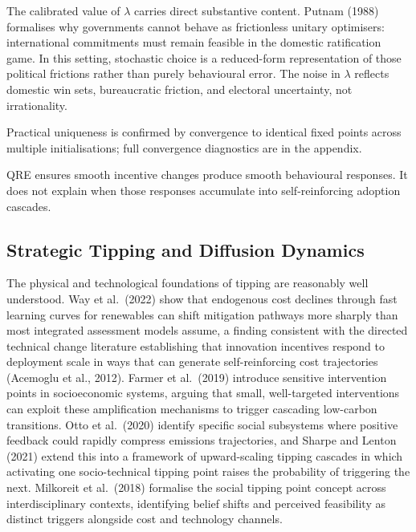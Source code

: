 \documentclass[10pt,a4paper]{article}
\begin{document}
The calibrated value of $\lambda$ carries direct substantive content. Putnam (1988) formalises why governments
cannot behave as frictionless unitary optimisers: international commitments must remain feasible in the
domestic ratification game. In this setting, stochastic choice is a reduced-form representation of those
political frictions rather than purely behavioural error. The noise in $\lambda$ reflects domestic win sets,
bureaucratic friction, and electoral uncertainty, not irrationality.

Practical uniqueness is confirmed by convergence to identical fixed points across multiple initialisations; full convergence diagnostics are in the appendix.

QRE ensures smooth incentive changes produce smooth behavioural responses. It does not explain when those responses accumulate into self-reinforcing adoption cascades.

\needspace{12em}
\subsection*{Strategic Tipping and Diffusion Dynamics}

The physical and technological foundations of tipping are reasonably well understood. Way et al.\ (2022)
show that endogenous cost declines through fast learning curves for renewables can shift mitigation
pathways more sharply than most integrated assessment models assume, a finding consistent with the
directed technical change literature establishing that innovation incentives respond to deployment scale in
ways that can generate self-reinforcing cost trajectories (Acemoglu et al., 2012). Farmer et al.\ (2019)
introduce sensitive intervention points in socioeconomic systems, arguing that small, well-targeted
interventions can exploit these amplification mechanisms to trigger cascading low-carbon transitions.
Otto et al.\ (2020) identify specific social subsystems where positive feedback could rapidly compress
emissions trajectories, and Sharpe and Lenton (2021) extend this into a framework of upward-scaling
tipping cascades in which activating one socio-technical tipping point raises the probability of triggering
the next. Milkoreit et al.\ (2018) formalise the social tipping point concept across interdisciplinary
contexts, identifying belief shifts and perceived feasibility as distinct triggers alongside cost and
technology channels.
\end{document}
